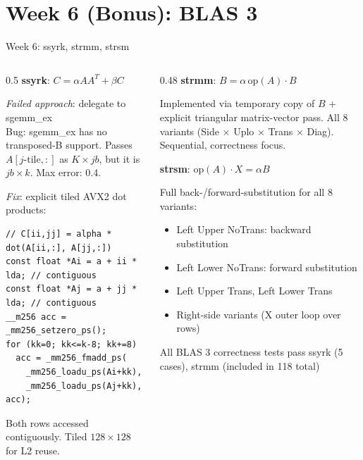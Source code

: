 \documentclass[aspectratio=169,10pt]{beamer}
\begin{document}
\section{Week 6 (Bonus): BLAS 3}

\begin{frame}[fragile]{Week 6: ssyrk, strmm, strsm}
  \begin{columns}[T]
    \begin{column}{0.5\textwidth}
      \textbf{ssyrk}: $C = \alpha A A^T + \beta C$

      \medskip
      \textit{Failed approach}: delegate to sgemm\_ex\\
      \alert{Bug}: sgemm\_ex has no transposed-B support. Passes $A[j\text{-tile},:]$ as $K \times jb$, but it is $jb \times k$. Max error: 0.4.

      \medskip
      \textit{Fix}: explicit tiled AVX2 dot products:
      \begin{lstlisting}
// C[ii,jj] = alpha * dot(A[ii,:], A[jj,:])
const float *Ai = a + ii * lda; // contiguous
const float *Aj = a + jj * lda; // contiguous
__m256 acc = _mm256_setzero_ps();
for (kk=0; kk<=k-8; kk+=8)
  acc = _mm256_fmadd_ps(
    _mm256_loadu_ps(Ai+kk),
    _mm256_loadu_ps(Aj+kk), acc);
      \end{lstlisting}
      Both rows accessed contiguously. Tiled $128\times128$ for L2 reuse.
    \end{column}
    \begin{column}{0.48\textwidth}
      \textbf{strmm}: $B = \alpha \,\mathrm{op}(A) \cdot B$

      Implemented via temporary copy of $B$ + explicit triangular matrix-vector pass. All 8 variants (Side $\times$ Uplo $\times$ Trans $\times$ Diag). Sequential, correctness focus.

      \vspace{0.8em}
      \textbf{strsm}: $\mathrm{op}(A) \cdot X = \alpha B$

      Full back-/forward-substitution for all 8 variants:
      \begin{itemize}
        \item Left Upper NoTrans: backward substitution
        \item Left Lower NoTrans: forward substitution
        \item Left Upper Trans, Left Lower Trans
        \item Right-side variants (X outer loop over rows)
      \end{itemize}

      \begin{exampleblock}{All BLAS 3 correctness tests pass}
        \scriptsize ssyrk (5 cases), strmm (included in 118 total)
      \end{exampleblock}
    \end{column}
  \end{columns}
\end{frame}
\end{document}

